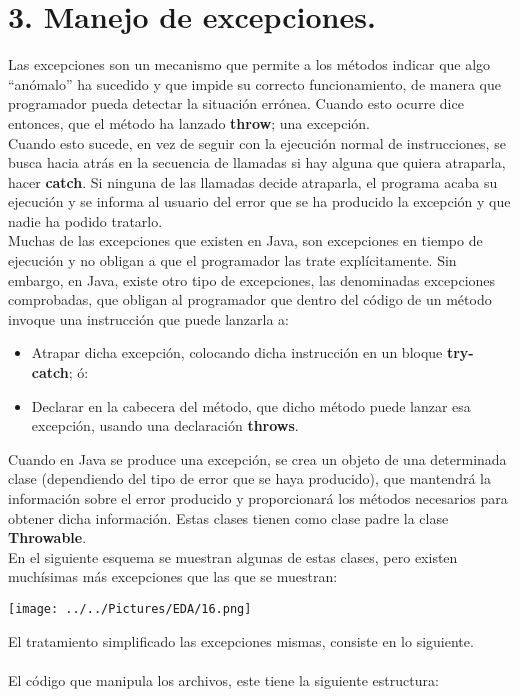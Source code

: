 \documentclass[12pt,letterpaper]{report}
\begin{document}
\section*{\centering \LARGE 3. Manejo de excepciones.}
Las excepciones son un mecanismo que permite a los métodos indicar  que algo “anómalo” ha sucedido y que impide su correcto  funcionamiento, de manera que programador pueda detectar  la situación errónea. Cuando esto ocurre dice entonces, que el método ha lanzado \textbf{throw}; una excepción.\\
Cuando esto sucede, en vez de seguir con la  ejecución normal de instrucciones, se busca hacia atrás en la secuencia de llamadas si hay alguna que quiera atraparla, hacer \textbf{catch}. Si ninguna de las llamadas decide atraparla, el programa acaba su ejecución y se informa al usuario del error que se ha producido la excepción y que nadie ha podido tratarlo.\\
Muchas de las excepciones que existen en Java, son excepciones en tiempo de ejecución y  no obligan a que el programador las trate explícitamente. Sin embargo, en Java, existe otro tipo de excepciones, las denominadas excepciones comprobadas, que obligan al programador que dentro del código de un método invoque una instrucción que puede  lanzarla a:
\begin{itemize}
	\item Atrapar dicha excepción, colocando dicha instrucción en  un bloque \textbf{try-catch}; ó:
	\item Declarar en la cabecera del método, que dicho método puede lanzar esa excepción, usando una declaración \textbf{throws}.
\end{itemize}
Cuando en Java se produce una excepción, se crea un objeto de una determinada clase (dependiendo del tipo de error que se haya producido), que mantendrá la información sobre el error producido y proporcionará los métodos necesarios para obtener dicha información. Estas clases tienen como clase padre la clase \textbf{Throwable}.\\
En el siguiente esquema se muestran algunas de estas clases, pero existen muchísimas más excepciones que las que se muestran:
\begin{center}
\texttt{[image: ../../Pictures/EDA/16.png]} 
\end{center}
El tratamiento simplificado  las excepciones mismas, consiste en lo siguiente.\\\\
El código que manipula los archivos, este tiene la siguiente estructura:
\end{document}
